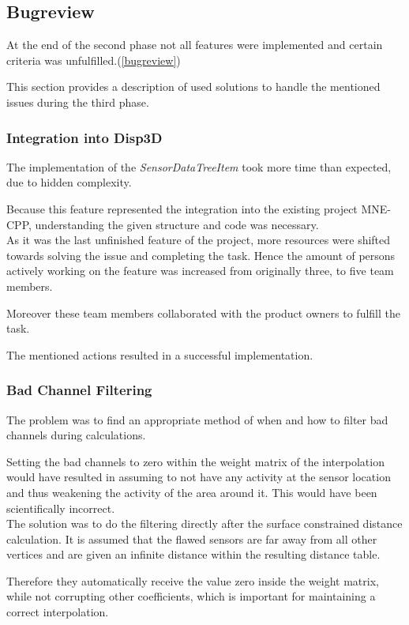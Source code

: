 \subsection{Bugreview}
At the end of the second phase not all features were implemented and certain criteria was unfulfilled.(\ref{bugreview})

This section provides a description of used solutions to handle the mentioned issues during the third phase.

\subsubsection{Integration into Disp3D} The implementation of the \textit{SensorDataTreeItem} took more time than expected, due to hidden complexity. 

Because this feature represented the integration into the existing project MNE-CPP, understanding the given structure and code was necessary.
\\
As it was the last unfinished feature of the project, more resources were shifted towards solving the issue and completing the task. Hence the amount of persons actively working on the feature was increased from originally three, to five team members.  

Moreover these team members collaborated with the product owners to fulfill the task. 

The mentioned actions resulted in a successful implementation.

\subsubsection{Bad Channel Filtering}The problem was to find an appropriate method of when and how to filter bad channels during calculations. 

Setting the bad channels to zero within the weight matrix of the interpolation would have resulted in assuming to not have any activity at the sensor location and thus weakening the activity of the area around it. This would have been scientifically incorrect. 
\\

The solution was to do the filtering directly after the surface constrained distance calculation. It is assumed that the flawed sensors are far away from all other vertices and  are given an infinite distance within the resulting distance table. 

Therefore they automatically receive the value zero inside the weight matrix, while not corrupting other coefficients, which is important for maintaining a correct interpolation.